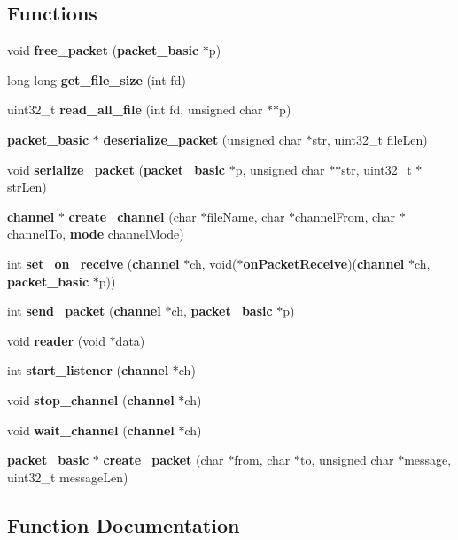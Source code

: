 \subsection*{Functions}
\begin{DoxyCompactItemize}
\item 
void {\bf free\+\_\+packet} ({\bf packet\+\_\+basic} $\ast$p)
\item 
long long {\bf get\+\_\+file\+\_\+size} (int fd)
\item 
uint32\+\_\+t {\bf read\+\_\+all\+\_\+file} (int fd, unsigned char $\ast$$\ast$p)
\item 
{\bf packet\+\_\+basic} $\ast$ {\bf deserialize\+\_\+packet} (unsigned char $\ast$str, uint32\+\_\+t file\+Len)
\item 
void {\bf serialize\+\_\+packet} ({\bf packet\+\_\+basic} $\ast$p, unsigned char $\ast$$\ast$str, uint32\+\_\+t $\ast$str\+Len)
\item 
{\bf channel} $\ast$ {\bf create\+\_\+channel} (char $\ast$file\+Name, char $\ast$channel\+From, char $\ast$channel\+To, {\bf mode} channel\+Mode)
\item 
int {\bf set\+\_\+on\+\_\+receive} ({\bf channel} $\ast$ch, void($\ast${\bf on\+Packet\+Receive})({\bf channel} $\ast$ch, {\bf packet\+\_\+basic} $\ast$p))
\item 
int {\bf send\+\_\+packet} ({\bf channel} $\ast$ch, {\bf packet\+\_\+basic} $\ast$p)
\item 
void {\bf reader} (void $\ast$data)
\item 
int {\bf start\+\_\+listener} ({\bf channel} $\ast$ch)
\item 
void {\bf stop\+\_\+channel} ({\bf channel} $\ast$ch)
\item 
void {\bf wait\+\_\+channel} ({\bf channel} $\ast$ch)
\item 
{\bf packet\+\_\+basic} $\ast$ {\bf create\+\_\+packet} (char $\ast$from, char $\ast$to, unsigned char $\ast$message, uint32\+\_\+t message\+Len)
\end{DoxyCompactItemize}


\subsection{Function Documentation}
